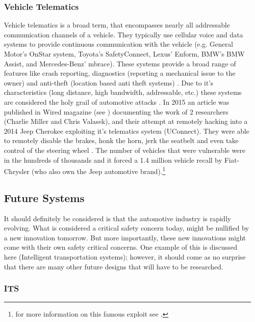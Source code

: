 \subsubsection{Vehicle Telematics} 
\label{subsubsec:telematics}

Vehicle telematics is a broad term, that encompasses nearly all addressable communication channels of a vehicle. They typically use cellular voice and data systems to provide continuous communication with the vehicle (e.g. General Motor's OnStar system, Toyota's SafetyConnect, Lexus' Enform, BMW's BMW Assist, and Mercedes-Benz' mbrace). These systems provide a broad range of features like crash reporting, diagnostics (reporting a mechanical issue to the owner) and anti-theft (location based anti theft systems) \cite{Kosher}. Due to it's characteristics (long distance, high bandwidth, addressable, etc.) these systems are considered the holy grail of automotive attacks \cite{MillerA}. In 2015 an article was published in Wired magazine (see \cite{Wired}) documenting the work of 2 researchers (Charlie Miller and Chris Valasek), and their attempt at remotely hacking into a 2014 Jeep Cherokee exploiting it's telematics system (UConnect). They were able to remotely disable the brakes, honk the horn, jerk the seatbelt and even take control of the steering wheel \cite{Wired}. The number of vehicles that were vulnerable were in the hundreds of thousands and it forced a 1.4 million vehicle recall by Fiat-Chrysler (who also own the Jeep automotive brand).\footnote{for more information on this famous exploit see \cite{MillerD}.}

\subsection{Future Systems}
\label{subsec:future_systems}

It should definitely be considered is that the automotive industry is rapidly evolving. What is considered a critical safety concern today, might be nullified by a new innovation tomorrow. But more importantly, these new innovations might come with their own safety critical concerns. One example of this is discussed here (Intelligent transportation systems); however, it should come as no surprise that there are many other future designs that will have to be researched.

\subsubsection{ITS} 
\label{subsubsec:its}

